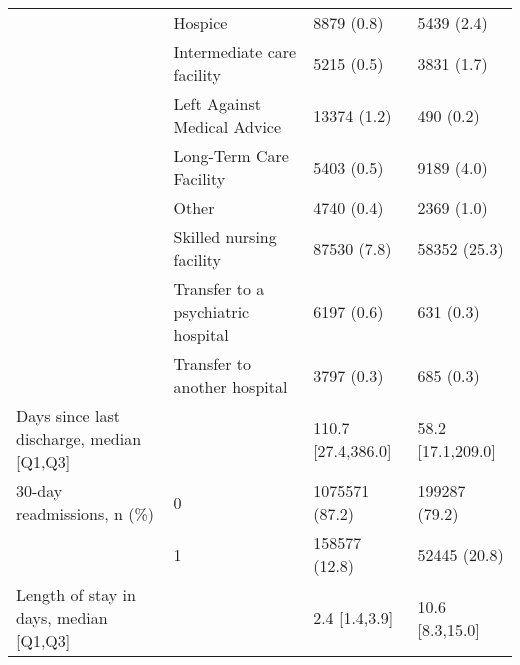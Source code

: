 \begin{tabular}{llll}
                                       & Hospice &                            8879 (0.8) &         5439 (2.4) \\
                                       & Intermediate care facility &                            5215 (0.5) &         3831 (1.7) \\
                                       & Left Against Medical Advice &                           13374 (1.2) &          490 (0.2) \\
                                       & Long-Term Care Facility &                            5403 (0.5) &         9189 (4.0) \\
                                       & Other &                            4740 (0.4) &         2369 (1.0) \\
                                       & Skilled nursing facility &                           87530 (7.8) &       58352 (25.3) \\
                                       & Transfer to a psychiatric hospital &                            6197 (0.6) &          631 (0.3) \\
                                       & Transfer to another hospital &                            3797 (0.3) &          685 (0.3) \\
Days since last discharge, median [Q1,Q3] &   &                    110.7 [27.4,386.0] &  58.2 [17.1,209.0] \\
30-day readmissions, n (\%) & 0 &                        1075571 (87.2) &      199287 (79.2) \\
                                       & 1 &                         158577 (12.8) &       52445 (20.8) \\
Length of stay in days, median [Q1,Q3] &   &                         2.4 [1.4,3.9] &    10.6 [8.3,15.0] \\
\bottomrule
\end{tabular}
